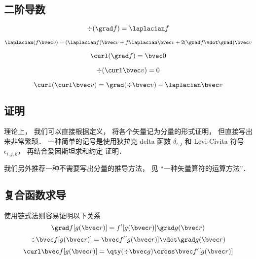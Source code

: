 \subsection{二阶导数}

\begin{equation}
\div (\grad f) = \laplacian f
\end{equation}

\begin{equation}\label{VopEq_eq5}
\laplacian (f \bvec v) = (\laplacian f)\bvec v + f \laplacian \bvec v + 2 (\grad f \vdot \grad) \bvec v
\end{equation}

\begin{equation}
\curl (\grad f) = \bvec 0
\end{equation}

\begin{equation}
\div (\curl \bvec v) = 0
\end{equation}

\begin{equation}
\curl(\curl \bvec v) = \grad(\div\bvec v) - \laplacian \bvec v
\end{equation}

\subsection{证明}
理论上， 我们可以直接根据定义， 将各个矢量记为分量的形式证明， 但直接写出来非常繁琐． 一种简单的记号是使用狄拉克 delta 函数 $\delta_{i,j}$ 和 Levi-Civita 符号 $\epsilon_{i,j,k}$， 再结合爱因斯坦求和约定%
证明．

我们另外推荐一种不需要写出分量的推导方法， 见 “一种矢量算符的运算方法”．

\subsection{复合函数求导}
使用链式法则容易证明以下关系
\begin{equation}
\grad f[g(\bvec r)] = f'[g(\bvec r)] \grad g(\bvec r)
\end{equation}
\begin{equation}
\div \bvec f[g(\bvec r)] = \bvec f'[g(\bvec r)] \vdot \grad g(\bvec r)
\end{equation}
\begin{equation}
\curl \bvec f[g(\bvec r)] = \qty(\div \bvec g) \cross \bvec f'[g(\bvec r)]
\end{equation}

